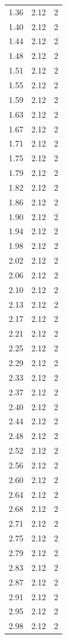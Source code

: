\begin{longtable}{lrr}
  1.36 & 2.12 & 2 \\
  1.40 & 2.12 & 2 \\
  1.44 & 2.12 & 2 \\
  1.48 & 2.12 & 2 \\
  1.51 & 2.12 & 2 \\
  1.55 & 2.12 & 2 \\
  1.59 & 2.12 & 2 \\
  1.63 & 2.12 & 2 \\
  1.67 & 2.12 & 2 \\
  1.71 & 2.12 & 2 \\
  1.75 & 2.12 & 2 \\
  1.79 & 2.12 & 2 \\
  1.82 & 2.12 & 2 \\
  1.86 & 2.12 & 2 \\
  1.90 & 2.12 & 2 \\
  1.94 & 2.12 & 2 \\
  1.98 & 2.12 & 2 \\
  2.02 & 2.12 & 2 \\
  2.06 & 2.12 & 2 \\
  2.10 & 2.12 & 2 \\
  2.13 & 2.12 & 2 \\
  2.17 & 2.12 & 2 \\
  2.21 & 2.12 & 2 \\
  2.25 & 2.12 & 2 \\
  2.29 & 2.12 & 2 \\
  2.33 & 2.12 & 2 \\
  2.37 & 2.12 & 2 \\
  2.40 & 2.12 & 2 \\
  2.44 & 2.12 & 2 \\
  2.48 & 2.12 & 2 \\
  2.52 & 2.12 & 2 \\
  2.56 & 2.12 & 2 \\
  2.60 & 2.12 & 2 \\
  2.64 & 2.12 & 2 \\
  2.68 & 2.12 & 2 \\
  2.71 & 2.12 & 2 \\
  2.75 & 2.12 & 2 \\
  2.79 & 2.12 & 2 \\
  2.83 & 2.12 & 2 \\
  2.87 & 2.12 & 2 \\
  2.91 & 2.12 & 2 \\
  2.95 & 2.12 & 2 \\
  2.98 & 2.12 & 2 \\

\end{longtable}
